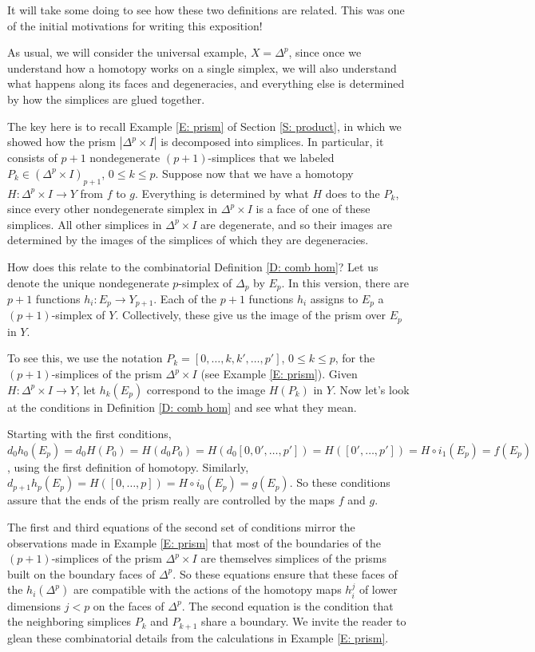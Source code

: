 \documentclass[12pt]{article}
\theoremstyle{plain}
\theoremstyle{definition}
\theoremstyle{remark}
\begin{document}
It will take some doing to see how these two definitions are related. This was one of the initial motivations for writing this exposition!

As usual, we will consider the universal example, $X=\Delta^p$, since once we understand how a homotopy works on a single simplex, we will also understand what happens along its faces and degeneracies, and everything else is determined by how the simplices are glued together. 

The key here is to recall Example \ref{E: prism} of Section \ref{S: product}, in which we showed how the prism $|\Delta^p\times I|$ is decomposed into simplices. In particular, it consists of $p+1$ nondegenerate $(p+1)$-simplices that we labeled $P_k\in (\Delta^p\times I)_{p+1}$, $0\leq k\leq p$. Suppose now that we have a homotopy $H\colon \Delta^p\times I\to Y$ from $f$ to $g$. Everything is determined by what $H$ does to the $P_k$, since every other nondegenerate simplex in $\Delta^p\times I$ is a face of one of these simplices. All other simplices in $\Delta^p\times I$ are degenerate, and so their images are determined by the images of the simplices of which they are degeneracies. 

How does this relate to the combinatorial Definition \ref{D: comb hom}? Let us denote the unique nondegenerate $p$-simplex of $\Delta_p$ by $E_p$. In this version, there are $p+1$ functions $h_i\colon E_p\to Y_{p+1}$. Each of the $p+1$ functions $h_i$ assigns to  $E_p$ a $(p+1)$-simplex of $Y$. Collectively, these give us the image of the prism over $E_p$ in $Y$. 

To see this, we use the notation $P_k=[0,\ldots,k,k',\ldots,p']$, $0\leq k\leq p$, for the $(p+1)$-simplices of the prism $\Delta^p\times I$ (see Example \ref{E: prism}). Given $H\colon \Delta^p\times I\to Y$, let  $h_k(E_p)$  correspond to the image $H(P_k)$ in $Y$. Now let's look at the conditions in  Definition \ref{D: comb hom} and see what they mean.

Starting with the first conditions, $d_0h_0(E_p)=d_0H(P_0)=H(d_0P_0)=H(d_0[0,0',\dots,p'])=H([0',\ldots, p'])=H\circ i_1(E_p)=f(E_p)$, using the first definition of homotopy. Similarly, $d_{p+1}h_p(E_p)=H([0,\ldots, p])=H\circ i_0(E_p)=g(E_p)$. So these conditions assure that the ends of the prism really are controlled by the maps $f$ and $g$.

The first and third equations of the second set of conditions mirror the observations made in Example \ref{E: prism} that most of the boundaries of the $(p+1)$-simplices of the prism $\Delta^p\times I$ are themselves  simplices of the prisms built on the boundary faces of $\Delta^p$. So these equations ensure that these faces of the $h_i(\Delta^p)$ are compatible with the actions of the homotopy maps $h_i^{j}$ of lower dimensions $j<p$ on the faces of $\Delta^p$. The second equation is the condition that the neighboring simplices $P_k$ and $P_{k+1}$ share a boundary. We invite the reader to glean these combinatorial details from the calculations in Example \ref{E: prism}.
\end{document}

